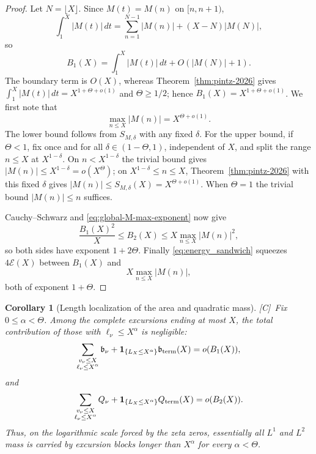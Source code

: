 \documentclass[11pt,reqno]{amsart}
\numberwithin{equation}{section}
\theoremstyle{plain}
\newtheorem{corollary}[theorem]{Corollary}
\theoremstyle{definition}
\theoremstyle{remark}
\newcommand{\En}{\mathcal{E}}
\newcommand{\tagC}{\textup{[C]}}
\begin{document}
\begin{proof}
Let $N=\lfloor X\rfloor$.  Since $M(t)=M(n)$ on $[n,n+1)$,
\begin{equation}
 \int_1^X|M(t)|\,dt
 =\sum_{n=1}^{N-1}|M(n)|+(X-N)|M(N)|,
\end{equation}
so
\begin{equation}
 B_1(X)=\int_1^X|M(t)|\,dt+O(|M(N)|+1).
\end{equation}
The boundary term is $O(X)$, whereas Theorem~\ref{thm:pintz-2026} gives
$\int_1^X|M(t)|\,dt=X^{1+\Theta+o(1)}$ and $\Theta\ge1/2$; hence
$B_1(X)=X^{1+\Theta+o(1)}$.
We first note that
\begin{equation}
\label{eq:global-M-max-exponent}
 \max_{n\le X}|M(n)|=X^{\Theta+o(1)}.
\end{equation}
The lower bound follows from $S_{M,\delta}$ with any fixed $\delta$.  For
the upper bound, if $\Theta<1$, fix once and for all
$\delta\in(1-\Theta,1)$, independent of $X$, and split the range
$n\le X$ at $X^{1-\delta}$. On $n<X^{1-\delta}$ the trivial bound gives
$|M(n)|\le X^{1-\delta}=o(X^\Theta)$; on $X^{1-\delta}\le n\le X$,
Theorem~\ref{thm:pintz-2026} with this fixed $\delta$ gives
$|M(n)|\le S_{M,\delta}(X)=X^{\Theta+o(1)}$. When $\Theta=1$ the trivial
bound $|M(n)|\le n$ suffices.

Cauchy--Schwarz and \eqref{eq:global-M-max-exponent} now give
\begin{equation}
 \frac{B_1(X)^2}{X}\le B_2(X)
 \le X\max_{n\le X}|M(n)|^2,
\end{equation}
so both sides have exponent $1+2\Theta$.  Finally
\eqref{eq:energy_sandwich} squeezes $4\En(X)$ between $B_1(X)$ and
\begin{equation}
 X\max_{n\le X}|M(n)|,
\end{equation}
both of exponent $1+\Theta$.
\end{proof}

\begin{corollary}[Length localization of the area and quadratic mass]
\label{cor:pintz-length-localization}
\tagC\ Fix $0\le\alpha<\Theta$.  Among the complete excursions ending at most $X$,
the total contribution of those with $\ell_\nu\le X^\alpha$ is negligible:
\begin{equation}
 \sum_{\substack{v_\nu\le X\\ \ell_\nu\le X^\alpha}}\mathfrak b_\nu
 +\mathbf 1_{\{L_X\le X^\alpha\}}\mathfrak b_{\rm term}(X)
 =o(B_1(X)),
\end{equation}
and
\begin{equation}
 \sum_{\substack{v_\nu\le X\\ \ell_\nu\le X^\alpha}}Q_\nu
 +\mathbf 1_{\{L_X\le X^\alpha\}}Q_{\rm term}(X)
 =o(B_2(X)).
\end{equation}
Thus, on the logarithmic scale forced by the zeta zeros, essentially all
$L^1$ and $L^2$ mass is carried by excursion blocks longer than
$X^\alpha$ for every $\alpha<\Theta$.
\end{corollary}
\end{document}
